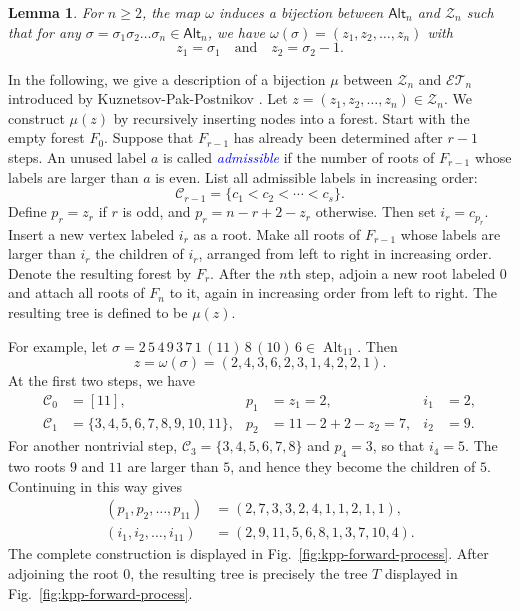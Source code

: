 \documentclass[12pt]{article}
\def\blue{\textcolor{blue}}
\def\blue{\textcolor{blue}}
\numberwithin{equation}{section}
\def\blue{\textcolor{blue}}
\def\blue{\textcolor{blue}}
\theoremstyle{plain}
\newtheorem{lemma}[theorem]{Lemma}
\def\Alt{\mathsf{Alt}}
\begin{document}
   
  \begin{lemma}\label{lem-omega}
  	For $n\geq 2$, the map $\omega$ induces a bijection between $\Alt_n$ and $\mathcal{Z}_n$ such that for any $\sigma=\sigma_1\sigma_2\ldots \sigma_n\in \Alt_n$,  we have $\omega(\sigma)=(z_1, z_2, \ldots, z_n)$ with 
  	\begin{equation}\label{eq-omega}
  		z_1=\sigma_1\quad\text{and}\quad z_2=\sigma_2-1.
  	\end{equation}
  \end{lemma}
  In the following, we give a description of a bijection  $\mu$ between $\mathcal{Z}_n$ and $\mathcal{ET}_n$ introduced by  Kuznetsov-Pak-Postnikov \cite{KPP}.  Let \(z=(z_1,z_2,\ldots,z_n)\in\mathcal Z_n\). We construct
  \(\mu(z)\) by recursively inserting nodes into a forest. Start with the
  empty forest \(F_0\). Suppose that \(F_{r-1}\) has already been determined after $r-1$ steps. 
  An unused label \(a\) is called \blue{\em admissible} if the number of roots of
  \(F_{r-1}\) whose labels are larger than \(a\) is even.
  List all admissible labels in increasing order:
  \[
  \mathcal C_{r-1}
  =\{c_1<c_2<\cdots<c_s\}.
  \]
  Define \(p_r=z_r\) if \(r\) is odd, and  \(p_r=n-r+2-z_r\) otherwise. Then set \(i_r=c_{p_r}\). 
  Insert a new vertex labeled \(i_r\) as a root. Make all roots of
  \(F_{r-1}\) whose labels are larger than \(i_r\) the children of \(i_r\),
  arranged from left to right in increasing order. Denote the resulting
  forest by \(F_r\).   
  After the \(n\)th step, adjoin a new root labeled \(0\) and attach all
  roots of \(F_n\) to it, again in increasing order from left to right.
  The resulting tree is defined to be \(\mu(z)\).
  
  
  
  
  
  For example, let
  \(
  \sigma=2\,5\,4\,9\,3\,7\,1\,(11)\,8\,(10)\,6
  \in\operatorname{Alt}_{11}.
  \)
  Then
  \[
  z=\omega(\sigma)=(2,4,3,6,2,3,1,4,2,2,1).
  \]
  At the first two steps, we have
  \[
  \begin{aligned}
  	\mathcal C_0&=[11],
  	&p_1&=z_1=2,
  	&i_1&=2,\\
  	\mathcal C_1&=\{3,4,5,6,7,8,9,10,11\},
  	&p_2&=11-2+2-z_2=7,
  	&i_2&=9.
  \end{aligned}
  \]
  For another nontrivial step,
  $\mathcal C_3=\{3,4,5,6,7,8\}$ and $p_4=3$, so that $i_4=5$.
  The two roots $9$ and $11$ are larger than $5$, and hence they become the
  children of $5$.  Continuing in this way gives
  \[
  \begin{aligned}
  	(p_1,p_2,\ldots,p_{11})
  	&=(2,7,3,3,2,4,1,1,2,1,1),\\
  	(i_1,i_2,\ldots,i_{11})
  	&=(2,9,11,5,6,8,1,3,7,10,4).
  \end{aligned}
  \]
  The complete construction is displayed in
  Fig.~\ref{fig:kpp-forward-process}.  
  After adjoining the root $0$, the resulting tree is precisely the tree $T$
  displayed in Fig.~\ref{fig:kpp-forward-process}.  
  
\end{document}
